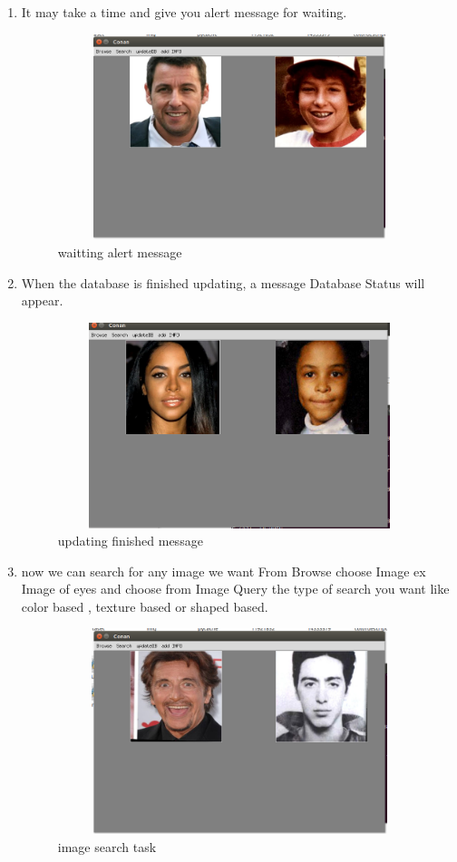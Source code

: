 \documentclass[pdftex,10pt,a4paper,oneside]{article}
\begin{document}
\begin{enumerate}
		\item 	It may take a time and give you alert message for waiting.
\begin{figure}[H]
	\centering
	\includegraphics[width=120mm,height=60mm]{fig/12.png}
	\caption{waitting alert message }
	\label{waitting alert message}
\end{figure}
	
	
	\pagebreak
			\item 	When the database is finished updating, a message Database Status will appear.
	\begin{figure}[H]
		\centering
		\includegraphics[width=120mm,height=60mm]{fig/13.png}
		\caption{updating finished message }
		\label{updating finished message}
	\end{figure}
	
	
	
	
	
	
	
	
		\item now we can search for any image we want From Browse choose Image ex Image of eyes and choose from Image Query the type of search you want like color based , texture based or shaped based. 
		
		\begin{figure}[H]
			\centering
			\includegraphics[width=120mm,height=60mm]{fig/11.png}
			\caption{image search task}
			\label{image search task}
		\end{figure}



\end{enumerate}
\end{document}
